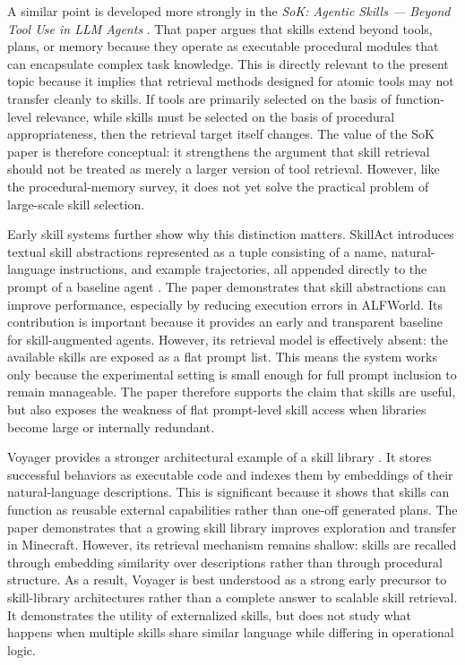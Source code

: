 \documentclass[a4paper]{article}
\begin{document}
A similar point is developed more strongly in the \emph{SoK: Agentic Skills --- Beyond Tool Use in LLM Agents} \cite{jiang2026sok}. That paper argues that skills extend beyond tools, plans, or memory because they operate as executable procedural modules that can encapsulate complex task knowledge. This is directly relevant to the present topic because it implies that retrieval methods designed for atomic tools may not transfer cleanly to skills. If tools are primarily selected on the basis of function-level relevance, while skills must be selected on the basis of procedural appropriateness, then the retrieval target itself changes. The value of the SoK paper is therefore conceptual: it strengthens the argument that skill retrieval should not be treated as merely a larger version of tool retrieval. However, like the procedural-memory survey, it does not yet solve the practical problem of large-scale skill selection.

Early skill systems further show why this distinction matters. SkillAct introduces textual skill abstractions represented as a tuple consisting of a name, natural-language instructions, and example trajectories, all appended directly to the prompt of a baseline agent \cite{liu2024skillact}. The paper demonstrates that skill abstractions can improve performance, especially by reducing execution errors in ALFWorld. Its contribution is important because it provides an early and transparent baseline for skill-augmented agents. However, its retrieval model is effectively absent: the available skills are exposed as a flat prompt list. This means the system works only because the experimental setting is small enough for full prompt inclusion to remain manageable. The paper therefore supports the claim that skills are useful, but also exposes the weakness of flat prompt-level skill access when libraries become large or internally redundant.

Voyager provides a stronger architectural example of a skill library \cite{wang2023voyager}. It stores successful behaviors as executable code and indexes them by embeddings of their natural-language descriptions. This is significant because it shows that skills can function as reusable external capabilities rather than one-off generated plans. The paper demonstrates that a growing skill library improves exploration and transfer in Minecraft. However, its retrieval mechanism remains shallow: skills are recalled through embedding similarity over descriptions rather than through procedural structure. As a result, Voyager is best understood as a strong early precursor to skill-library architectures rather than a complete answer to scalable skill retrieval. It demonstrates the utility of externalized skills, but does not study what happens when multiple skills share similar language while differing in operational logic.
\end{document}
